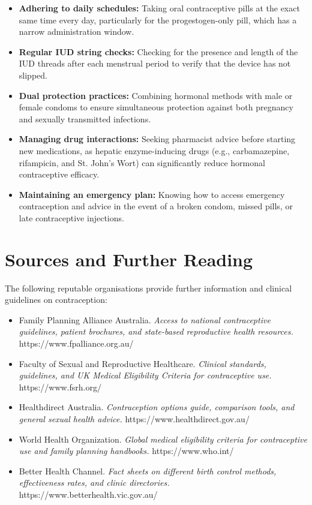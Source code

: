 \begin{itemize}
    \item \textbf{Adhering to daily schedules:} Taking oral contraceptive pills at the exact same time every day, particularly for the progestogen-only pill, which has a narrow administration window.
    \item \textbf{Regular IUD string checks:} Checking for the presence and length of the IUD threads after each menstrual period to verify that the device has not slipped.
    \item \textbf{Dual protection practices:} Combining hormonal methods with male or female condoms to ensure simultaneous protection against both pregnancy and sexually transmitted infections.
    \item \textbf{Managing drug interactions:} Seeking pharmacist advice before starting new medications, as hepatic enzyme-inducing drugs (e.g., carbamazepine, rifampicin, and St. John's Wort) can significantly reduce hormonal contraceptive efficacy.
    \item \textbf{Maintaining an emergency plan:} Knowing how to access emergency contraception and advice in the event of a broken condom, missed pills, or late contraceptive injections.
\end{itemize}

\section*{Sources and Further Reading}
The following reputable organisations provide further information and clinical guidelines on contraception:

\begin{itemize}
    \item Family Planning Alliance Australia. \textit{Access to national contraceptive guidelines, patient brochures, and state-based reproductive health resources.} https://www.fpalliance.org.au/
    \item Faculty of Sexual and Reproductive Healthcare. \textit{Clinical standards, guidelines, and UK Medical Eligibility Criteria for contraceptive use.} https://www.fsrh.org/
    \item Healthdirect Australia. \textit{Contraception options guide, comparison tools, and general sexual health advice.} https://www.healthdirect.gov.au/
    \item World Health Organization. \textit{Global medical eligibility criteria for contraceptive use and family planning handbooks.} https://www.who.int/
    \item Better Health Channel. \textit{Fact sheets on different birth control methods, effectiveness rates, and clinic directories.} https://www.betterhealth.vic.gov.au/
\end{itemize}
